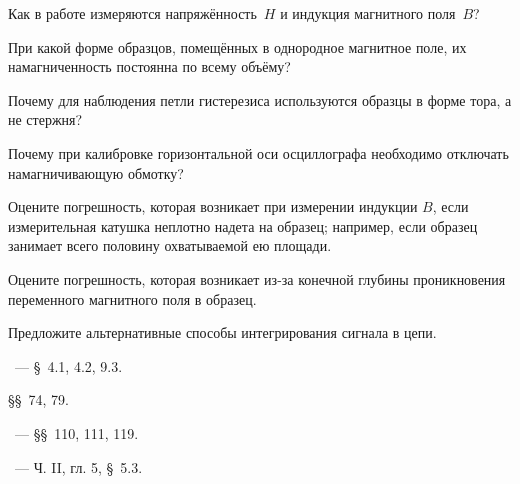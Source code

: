 \begin{lab:questions}

\item Как в работе измеряются напряжённость~$H$ и индукция магнитного поля~$B$?

\item
При какой форме образцов, помещённых в однородное магнитное поле, их
намагниченность постоянна по всему объёму?

\item
Почему для наблюдения петли гистерезиса используются образцы в форме тора,
а не стержня?

\item
Почему при калибровке горизонтальной оси осциллографа необходимо от­ключать
намагничивающую обмотку?

\item
Оцените погрешность, которая возникает при измерении индукции $B$, если
измерительная катушка неплотно надета на образец; например, если образец
занимает всего половину охватываемой ею площади.

\item
Оцените погрешность, которая возникает из-за конечной глубины проникновения
переменного магнитного поля в образец.

\item Предложите альтернативные способы интегрирования сигнала в цепи.

\end{lab:questions}


\begin{lab:literature}
\item \Kirichenko~--- \S~4.1, 4.2, 9.3.

\item \SivuhinIII \S\S~74, 79.

\item \Kalashnikov~--- \S\S~110, 111, 119.

\item \KingLokOlh~--- Ч. II, гл. 5, \S~5.3.
\end{lab:literature}
